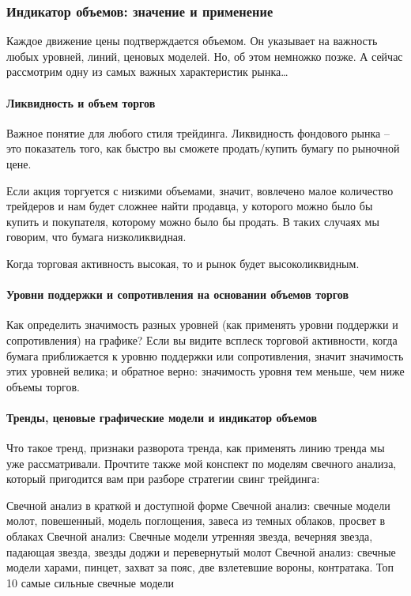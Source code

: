 \documentclass[a5paper]{article}
\begin{document}
\subsubsection{Индикатор объемов: значение и применение}

Каждое движение цены подтверждается объемом. Он указывает на важность
любых уровней, линий, ценовых моделей. Но, об этом немножко позже. А
сейчас рассмотрим одну из самых важных характеристик рынка…

\paragraph{Ликвидность и объем торгов}

Важное понятие для любого стиля трейдинга. Ликвидность фондового рынка – это показатель того, как быстро вы сможете продать/купить бумагу по рыночной цене.

Если акция торгуется с низкими объемами, значит, вовлечено малое количество трейдеров и нам будет сложнее найти продавца, у которого можно было бы купить и покупателя, которому можно было бы продать. В таких случаях мы говорим, что бумага низколиквидная.

Когда торговая активность высокая, то и рынок будет высоколиквидным.

\paragraph{Уровни поддержки и сопротивления на основании объемов
  торгов}

Как определить значимость разных уровней (как применять уровни
поддержки и сопротивления) на графике? Если вы видите всплеск торговой
активности, когда бумага приближается к уровню поддержки или
сопротивления, значит значимость этих уровней велика; и обратное
верно: значимость уровня тем меньше, чем ниже объемы торгов.

\paragraph{Тренды, ценовые графические модели и индикатор объемов}

Что такое тренд, признаки разворота тренда, как применять линию тренда мы уже рассматривали. Прочтите также мой конспект по моделям свечного анализа, который пригодится вам при разборе стратегии свинг трейдинга:

    Свечной анализ в краткой и доступной форме
    Свечной анализ: свечные модели молот, повешенный, модель поглощения, завеса из темных облаков, просвет в облаках
    Свечной анализ: Свечные модели утренняя звезда, вечерняя звезда, падающая звезда, звезды доджи и перевернутый молот
    Свечной анализ: свечные модели харами, пинцет, захват за пояс, две взлетевшие вороны, контратака.
    Топ 10 самые сильные свечные модели
\end{document}

